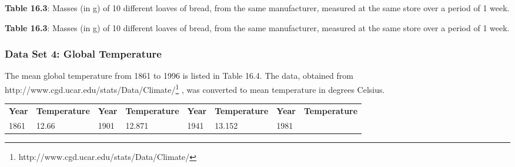 \begin{description}[noitemsep]
\begin{description}[noitemsep]
\begin{table}
\begin{center}
\begin{xtabular}[t]{|l|l|l|l|l|l|l|}
    \end{xtabular}
      \end{center}
    \begin{center}{\small\bfseries Table 16.3}: Masses (in g) of 10 different loaves of bread, from the same manufacturer, measured at the same store over a period of 1 week.\end{center}
    \begin{caption}{\small\bfseries Table 16.3}: Masses (in g) of 10 different loaves of bread, from the same manufacturer, measured at the same store over a period of 1 week.\end{caption}
\end{table}
    \par
      \label{m39403*uid30}
            \subsubsection{ Data Set 4: Global Temperature}
            \nopagebreak
            \label{m39403*id203994}The mean global temperature from 1861 to 1996 is listed in Table 16.4. The data, obtained from http://www.cgd.ucar.edu/stats/Data/Climate/\footnote{http://www.cgd.ucar.edu/stats/Data/Climate/}
        , was converted to mean temperature in degrees Celsius.\par 
          \begin{table}
        \begin{center}
      \label{m39403*eip-685}
    \noindent
      \tablelasttail{}
      \begin{xtabular}[t]{|l|l|l|l|l|l|l|l|}\hline
        \textbf{	Year}	 &
        	\textbf{Temperature}		 &
        	\textbf{Year}		 &
        \textbf{	Temperature}		 &
        \textbf{	Year}		 &
        	\textbf{Temperature}		 &
        	\textbf{Year}		 &
        	\textbf{Temperature}		%
     \tabularnewline{}
        	1861	 &
        	12.66	 &
        	1901	 &
        	12.871	 &
        	1941	 &
        	13.152	 &
        	1981	 &

\end{xtabular}
\end{center}
\end{table}
\end{description}
\end{description}
